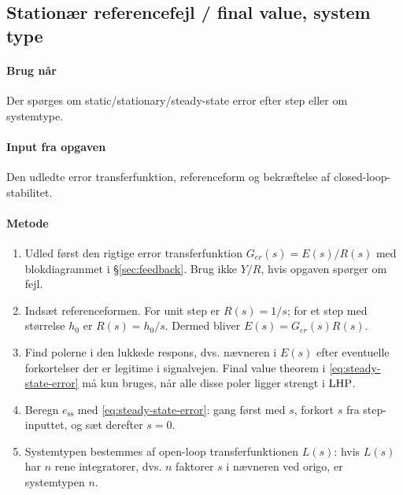 \subsection{Stationær referencefejl / final value, system type}

\paragraph{Brug når}
Der spørges om static/stationary/steady-state error efter step eller om systemtype.

\paragraph{Input fra opgaven}
Den udledte error transferfunktion, referenceform og bekræftelse af closed-loop-stabilitet.

\paragraph{Metode}
\begin{enumerate}
\item Udled først den rigtige error transferfunktion \(G_{er}(s)=E(s)/R(s)\) med
      blokdiagrammet i \S\ref{sec:feedback}. Brug ikke \(Y/R\), hvis opgaven spørger
      om fejl.
\item Indsæt referenceformen. For unit step er \(R(s)=1/s\); for et step med størrelse
      \(h_0\) er \(R(s)=h_0/s\). Dermed bliver \(E(s)=G_{er}(s)R(s)\).
\item Find polerne i den lukkede respons, dvs. nævneren i \(E(s)\) efter eventuelle
      forkortelser der er legitime i signalvejen. Final value theorem i
      \eqref{eq:steady-state-error} må kun bruges, når alle disse poler ligger strengt
      i \(\mathrm{LHP}\).
\item Beregn \(e_{\mathrm{ss}}\) med \eqref{eq:steady-state-error}: gang først med
      \(s\), forkort \(s\) fra step-inputtet, og sæt derefter \(s=0\).
\item Systemtypen bestemmes af open-loop transferfunktionen \(L(s)\): hvis \(L(s)\)
      har \(n\) rene integratorer, dvs. \(n\) faktorer \(s\) i nævneren ved origo,
      er systemtypen \(n\).
\end{enumerate}

